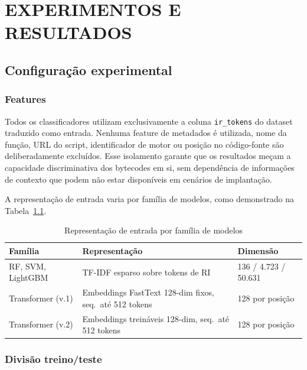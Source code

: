 \chapter{EXPERIMENTOS E RESULTADOS}
\label{cap:experimentos}

\section{Configuração experimental}
\label{sec:exp-config}

\subsection{Features}
\label{sub:exp-features}

Todos os classificadores utilizam exclusivamente a coluna \texttt{ir\_tokens} do
dataset traduzido como entrada. Nenhuma feature de metadados é utilizada, nome
da função, URL do script, identificador de motor ou posição no código-fonte são
deliberadamente excluídos. Esse isolamento garante que os resultados meçam a
capacidade discriminativa dos bytecodes em si, sem dependência de informações de
contexto que podem não estar disponíveis em cenários de implantação.

A representação de entrada varia por família de modelos, como demonstrado na Tabela~\ref{tab:features}.

\begin{table}[htb]
\centering
\caption{Representação de entrada por família de modelos}
\label{tab:features}
\begin{tabular}{l p{6cm} l}
\toprule
\textbf{Família} & \textbf{Representação} & \textbf{Dimensão} \\
\midrule
RF, SVM, LightGBM & TF-IDF esparso sobre tokens de RI & 136 / 4.723 / 50.631 \\
Transformer (v.1)  & Embeddings FastText 128-dim fixos, seq.\ até 512 tokens & 128 por posição \\
Transformer (v.2)  & Embeddings treináveis 128-dim, seq.\ até 512 tokens & 128 por posição \\
\bottomrule
\end{tabular}

\end{table}

\subsection{Divisão treino/teste}
\label{sub:exp-split}

